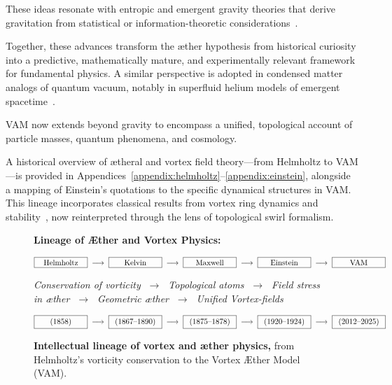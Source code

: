 These ideas resonate with entropic and emergent gravity theories that derive gravitation from statistical or information-theoretic considerations~\cite{Verlinde2011}.

Together, these advances transform the æther hypothesis from historical curiosity into a predictive, mathematically mature, and experimentally relevant framework for fundamental physics. A similar perspective is adopted in condensed matter analogs of quantum vacuum, notably in superfluid helium models of emergent spacetime~\cite{volovik2003universe}.


VAM now extends beyond gravity to encompass a unified, topological account of particle masses, quantum phenomena, and cosmology.

A historical overview of ætheral and vortex field theory—from Helmholtz to VAM—is provided in Appendices~\ref{appendix:helmholtz}–\ref{appendix:einstein}, alongside a mapping of Einstein’s quotations to the specific dynamical structures in VAM. This lineage incorporates classical results from vortex ring dynamics and stability~\cite{morris1977vortex}, now reinterpreted through the lens of topological swirl formalism.


\begin{figure}[htbp]
    \centering
    \vspace{1em}
    \noindent\textbf{Lineage of Æther and Vortex Physics:}

    \[
        \fbox{\makebox[2.2cm][c]{Helmholtz}} \;\longrightarrow\;
        \fbox{\makebox[2.2cm][c]{Kelvin}} \;\longrightarrow\;
        \fbox{\makebox[2.2cm][c]{Maxwell}} \;\longrightarrow\;
        \fbox{\makebox[2.2cm][c]{Einstein}} \;\longrightarrow\;
        \fbox{\makebox[2.2cm][c]{VAM}}
    \]

    \vspace{0.2em}
    {\scriptsize
    \textit{
        Conservation of vorticity $\;\rightarrow\;$ Topological atoms $\;\rightarrow\;$ Field stress in æther $\;\rightarrow\;$ Geometric æther $\;\rightarrow\;$ Unified Vortex-fields}
    }

    \vspace{0.2em}
    \[
        \fbox{\makebox[2.2cm][c]{(1858)}} \;\longrightarrow\;
        \fbox{\makebox[2.2cm][c]{(1867--1890)}} \;\longrightarrow\;
        \fbox{\makebox[2.2cm][c]{(1875--1878)}} \;\longrightarrow\;
        \fbox{\makebox[2.2cm][c]{(1920--1924)}} \;\longrightarrow\;
        \fbox{\makebox[2.2cm][c]{(2012--2025)}}
    \]

    \caption{\textbf{Intellectual lineage of vortex and æther physics,} from Helmholtz’s vorticity conservation to the Vortex Æther Model (VAM).}
    \label{fig:lineage-aether-vortex}
\end{figure}